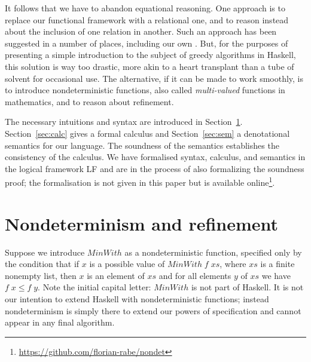 \documentclass{llncs}
\newcommand{\Conid}[1]{\mathit{#1}}
\newcommand{\Varid}[1]{\mathit{#1}}
\renewcommand{\leq}{\leqslant}
\begin{document}
It follows that we have to abandon equational reasoning.  One approach is to replace our 
functional framework with a relational one, and to reason instead about the inclusion of one 
relation in another. Such an approach has been suggested in a number of places, including our 
own \cite{bird&demoor}. But, for the purposes of presenting a simple introduction to the 
subject of greedy algorithms in Haskell, this solution is way too drastic, more akin to 
a heart transplant than a tube of solvent for occasional use. The alternative, if it can be 
made to work smoothly, is to introduce nondeterministic functions, also called 
\emph{multi-valued} functions in mathematics, and to reason about refinement. 

The necessary
intuitions and syntax are introduced in Section~\ref{sec:syn}. Section~\ref{sec:calc} gives 
a formal calculus and Section~\ref{sec:sem} a denotational semantics for our language.
The soundness of the semantics establishes the consistency of the calculus.
We have formalised syntax, calculus, and semantics in the logical framework LF \cite{lf} and are in the process of also formalizing the soundness proof; the formalisation is not given in this paper but is available online\footnote{\url{https://github.com/florian-rabe/nondet}}.

\section{Nondeterminism and refinement}\label{sec:syn}

Suppose we introduce \ensuremath{\Conid{MinWith}} as a nondeterministic function, specified only 
by the condition that if \ensuremath{\Varid{x}} is a possible value of \ensuremath{\Conid{MinWith}\;\Varid{f}\;\Varid{xs}},
where \ensuremath{\Varid{xs}} is a finite nonempty list, then \ensuremath{\Varid{x}} is an element of \ensuremath{\Varid{xs}} and for all
elements \ensuremath{\Varid{y}} of \ensuremath{\Varid{xs}} we have \ensuremath{\Varid{f}\;\Varid{x}\leq \Varid{f}\;\Varid{y}}.
Note the initial capital letter: \ensuremath{\Conid{MinWith}} is not part of Haskell. It is
not our intention to extend Haskell with nondeterministic functions; instead
nondeterminism is simply there to extend our powers of specification and cannot
appear in any final algorithm. 
\end{document}
